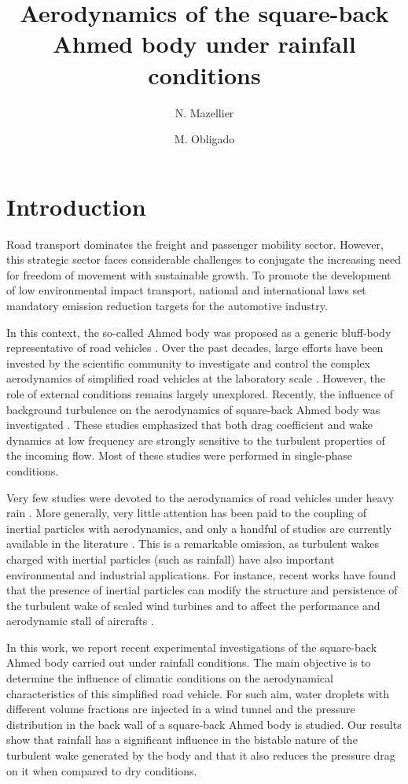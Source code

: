 \documentclass[doublecol]{epl2}
\title{Aerodynamics of the square-back Ahmed body under rainfall conditions}
\author{N. Mazellier\inst{1} \and M. Obligado\inst{2}}
\institute{                    
  \inst{1} University of Orl{\'e}ans, INSA-CVL, PRISME, EA 4229, 45072, Orl{\'e}ans, France\\
  \inst{2} Universit{\'e} Grenoble Alpes, CNRS, Grenoble-INP, LEGI, F-38000, Grenoble, France
}
\begin{document}
\maketitle
\section{Introduction}
Road transport dominates the freight and passenger mobility sector. However, this strategic sector faces considerable challenges to conjugate the increasing need for freedom of movement with sustainable growth. To promote the development of low environmental impact transport, national and international laws set mandatory emission reduction targets for the automotive industry. 

In this context, the so-called Ahmed body was proposed as a generic bluff-body representative of road vehicles \cite{ahmed1984}. Over the past decades, large efforts have been invested by the scientific community to investigate and control the complex aerodynamics of simplified road vehicles at the laboratory scale \cite{grandemange2013,barros2017,mcnally2019}. However, the role of external conditions remains largely unexplored. Recently, the influence of background turbulence on the aerodynamics of square-back Ahmed body was investigated \cite{burton2021,passaggia2021}. These studies emphasized that both drag coefficient and wake dynamics at low frequency are strongly sensitive to the turbulent properties of the incoming flow. Most of these studies were performed in single-phase conditions. 

Very few studies were devoted to the aerodynamics of road vehicles under heavy rain \cite{gaylard2014,patel2022,raeesi2023}. More generally, very little attention has been paid to the coupling of inertial particles with aerodynamics, and only a handful of studies are currently available in the literature  \cite{cao2014effects,wan2004aerodynamic}. This is a remarkable omission, as turbulent wakes charged with inertial particles (such as rainfall) have also important environmental and industrial applications. For instance, recent works have found that the presence of inertial particles can modify the structure and persistence of the turbulent wake of scaled wind turbines \cite{smith2021dynamic,travis2022} and to  affect the performance and aerodynamic stall of aircrafts \cite{sheidani2022study}.

In this work, we report recent experimental investigations of the square-back Ahmed body carried out under rainfall conditions. The main objective is to determine the influence of climatic conditions on the aerodynamical characteristics of this simplified road vehicle. For such aim, water droplets with different volume fractions are injected in a wind tunnel and the pressure distribution in the back wall of a square-back Ahmed body is studied. Our results show that rainfall has a significant influence in the bistable nature of the turbulent wake generated by the body and that it also reduces the pressure drag on it when compared to dry conditions.
\end{document}
